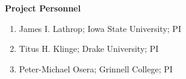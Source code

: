 \documentclass[11pt]{article}
\begin{document}
    \setcounter{page}{1}
    \begin{center}
        {\Large {\bf Project Personnel}}
    \end{center}
    \vspace*{1em}
    
    \begin{enumerate}
    	\item James I. Lathrop; Iowa State University; PI
    	\item Titus H. Klinge; Drake University; PI
    	\item Peter-Michael Osera; Grinnell College; PI
    \end{enumerate}
\end{document}
